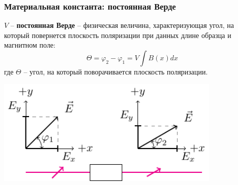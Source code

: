 \documentclass[10pt,pdf,hyperref={unicode}, dvipsnames, handout]{beamer}
\begin{document}
\begin{frame}
	\frametitle{Материальная константа: постоянная Верде}
	$V$ -- \textbf{постоянная Верде} -- физическая величина, характеризующая угол, на который повернется плоскость поляризации при данных длине образца и магнитном поле:
	\begin{equation}
		\Theta=\varphi_2-\varphi_1=V \int B(x)dx
	\end{equation}
	где $\Theta$ -- угол, на который поворачивается плоскость поляризации.
	\begin{center}
		\includegraphics[width=0.8\textwidth]{img/rotpol}
	\end{center}
\end{frame}
\end{document}
